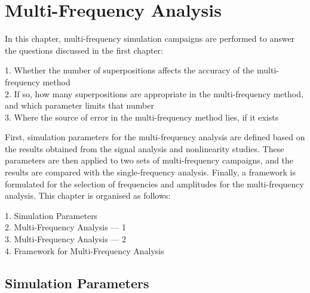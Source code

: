 \documentclass[../main]{subfiles}
\begin{document}




\chapter{Multi-Frequency Analysis}

In this chapter, multi-frequency simulation campaigns are performed to answer the questions 
discussed in the first chapter:

\begin{flushleft}
1. Whether the number of superpositions affects the accuracy of the multi-frequency method \\
2. If so, how many superpositions are appropriate in the multi-frequency method, and which parameter limits that number \\
3. Where the source of error in the multi-frequency method lies, if it exists \\
\end{flushleft}

First, simulation parameters for the multi-frequency analysis are defined based on 
the results obtained from the signal analysis and nonlinearity studies. 
These parameters are then applied to two sets of multi-frequency campaigns, and the results 
are compared with the single-frequency analysis. 
Finally, a framework is formulated for the selection of frequencies and amplitudes for the multi-frequency analysis. 
This chapter is organised as follows:

\begin{flushleft}
\hspace{2cm}1. Simulation Parameters \\
\hspace{2cm}2. Multi-Frequency Analysis --- 1 \\
\hspace{2cm}3. Multi-Frequency Analysis --- 2 \\
\hspace{2cm}4. Framework for Multi-Frequency Analysis \\
\end{flushleft}

\section{Simulation Parameters}
\end{document}
